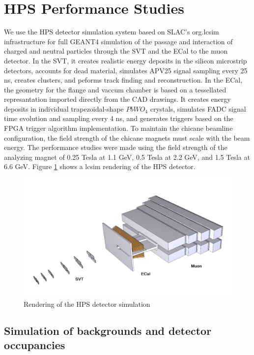 \def\etal{{\it et al.\/}}

\section{HPS Performance Studies}

We use the HPS detector simulation system based on SLAC's org.lcsim infrastructure for full GEANT4
simulation of the passage and interaction of charged and neutral particles through the SVT 
and the ECal to the muon detector. In the SVT, it creates realistic energy deposits in the silicon 
microstrip detectors, accounts for dead material, simulates APV25 signal sampling every 25 ns, 
creates clusters, and peforms track finding and reconstruction.
In the ECal, the geometry for the flange and vaccum chamber is based on a tessellated 
represantation imported directly from the CAD drawings. It creates energy deposits in individual 
trapezoidal-shape $PbWO_4$ crystals, simulates FADC signal time evolution and sampling every 4 ns, and 
generates triggers based on the  FPGA trigger algorithm implementation.
To maintain the chicane beamline configuration, the field strength of the
chicane magnets must scale with the beam energy. The performance studies were 
made using the field strength of the 
analyzing magnet of 0.25 Tesla at 1.1 GeV, 0.5 Tesla at 2.2 GeV, and 
1.5 Tesla at 6.6 GeV.
Figure  \ref{fig:lcsim} shows a lcsim rendering of the HPS detector.

\begin{figure}[h]
\includegraphics[width=\textwidth]{performance/lcsimDetector}
\caption{\small{ Rendering of the HPS detector simulation}}
\label{fig:lcsim}
\end{figure}

\subsection{Simulation of backgrounds and detector occupancies}

